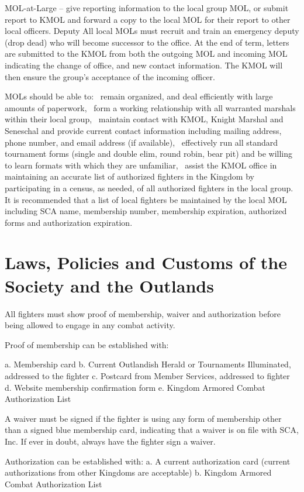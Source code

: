 \documentclass{article}
\begin{document}
MOL-at-Large – give reporting information to the local group MOL, or submit report to
KMOL and forward a copy to the local MOL for their report to other local officers.
Deputy All local MOLs must recruit and train an emergency deputy (drop dead) who will become
successor to the office. At the end of term, letters are submitted to the KMOL from both
the outgoing MOL and incoming MOL indicating the change of office, and new contact
information. The KMOL will then ensure the group’s acceptance of the incoming officer.

MOLs should be able to:
~remain organized, and deal efficiently with large amounts of paperwork,
~form a working relationship with all warranted marshals within their local group,
~maintain contact with KMOL, Knight Marshal and Seneschal and provide current contact
information including mailing address, phone number, and email address (if available),
~effectively run all standard tournament forms (single and double elim, round robin, bear pit) and
be willing to learn formats with which they are unfamiliar,
~assist the KMOL office in maintaining an accurate list of authorized fighters in the Kingdom by
participating in a census, as needed, of all authorized fighters in the local group. It is
recommended that a list of local fighters be maintained by the local MOL including SCA name,
membership number, membership expiration, authorized forms and authorization expiration.

\section{Laws, Policies and Customs of the Society and the Outlands}
All fighters must show proof of membership, waiver and authorization before being allowed to engage in
any combat activity.

Proof of membership can be established with:

a. Membership card
b. Current Outlandish Herald or Tournaments Illuminated, addressed to the fighter
c. Postcard from Member Services, addressed to fighter
d. Website membership confirmation form
e. Kingdom Armored Combat Authorization List

A waiver must be signed if the fighter is using any form of membership other than a signed blue
membership card, indicating that a waiver is on file with SCA, Inc. If ever in doubt, always have the
fighter sign a waiver.

Authorization can be established with:
a. A current authorization card (current authorizations from other Kingdoms are acceptable)
b. Kingdom Armored Combat Authorization List
\end{document}
